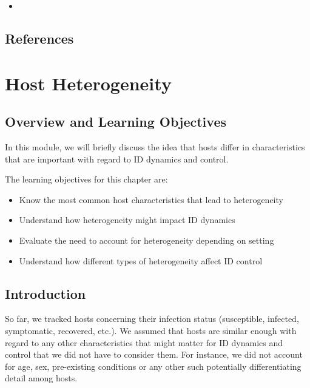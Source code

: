 \documentclass[
]{book}
\providecommand{\tightlist}{%
  \setlength{\itemsep}{0pt}\setlength{\parskip}{0pt}}
\begin{document}
\begin{itemize}
\item
\end{itemize}

\hypertarget{references-10}{%
\section{References}\label{references-10}}

\hypertarget{heterogeneity}{%
\chapter{Host Heterogeneity}\label{heterogeneity}}

\hypertarget{overview-and-learning-objectives-10}{%
\section{Overview and Learning Objectives}\label{overview-and-learning-objectives-10}}

In this module, we will briefly discuss the idea that hosts differ in characteristics that are important with regard to ID dynamics and control.

The learning objectives for this chapter are:

\begin{itemize}
\tightlist
\item
  Know the most common host characteristics that lead to heterogeneity
\item
  Understand how heterogeneity might impact ID dynamics
\item
  Evaluate the need to account for heterogeneity depending on setting
\item
  Understand how different types of heterogeneity affect ID control
\end{itemize}

\hypertarget{introduction-10}{%
\section{Introduction}\label{introduction-10}}

So far, we tracked hosts concerning their infection status (susceptible, infected, symptomatic, recovered, etc.). We assumed that hosts are similar enough with regard to any other characteristics that might matter for ID dynamics and control that we did not have to consider them. For instance, we did not account for age, sex, pre-existing conditions or any other such potentially differentiating detail among hosts.
\end{document}
